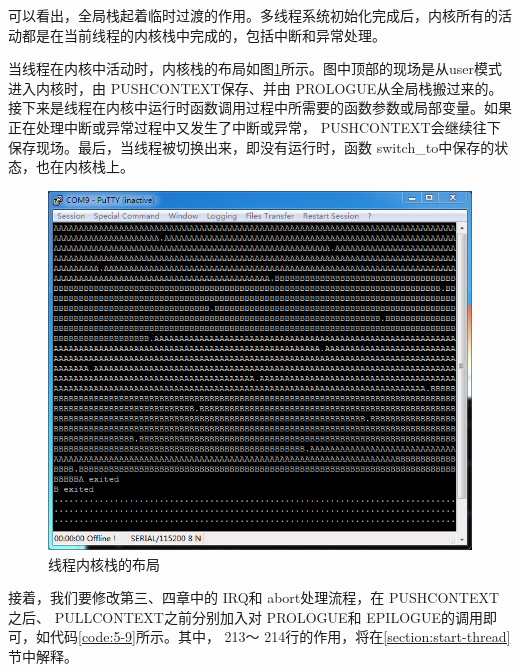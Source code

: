 \documentclass[main.tex]{subfiles}
\begin{document}
\begin{CJK*}{UTF8}{song}
\begin{code}
\label{code:5-8}
\inputminted[firstline=99,lastline=122,linenos,numbersep=5pt,frame=lines,framesep=2mm]{gas}{src/chapter05/kernel/entry.S}
\end{code}

\par
可以看出，全局栈起着临时过渡的作用。多线程系统初始化完成后，内核所有的活动都是在当前线程的内核栈中完成的，包括中断和异常处理。

\par
当线程在内核中活动时，内核栈的布局如图\ref{figure:5-2}所示。图中顶部的现场是从user模式进入内核时，由 PUSH\-CONTEXT保存、并由 PRO\-LOGUE从全局栈搬过来的。接下来是线程在内核中运行时函数调用过程中所需要的函数参数或局部变量。如果正在处理中断或异常过程中又发生了中断或异常， PUSH\-CONTEXT会继续往下保存现场。最后，当线程被切换出来，即没有运行时，函数 switch\_\-to中保存的状态，也在内核栈上。

\begin{figure}[htp]
\centering
\includegraphics[scale=0.4]{figures/5-2}
\caption{线程内核栈的布局}
\label{figure:5-2}
\end{figure}

\par
接着，我们要修改第三、四章中的 IRQ和 abort处理流程，在 PUSH\-CONTEXT之后、  PULL\-CONTEXT之前分别加入对 PRO\-LOGUE和 EPI\-LOGUE的调用即可，如代码\ref{code:5-9}所示。其中， 213～ 214行的作用，将在\ref{section:start-thread}节中解释。


\end{CJK*}
\end{document}
